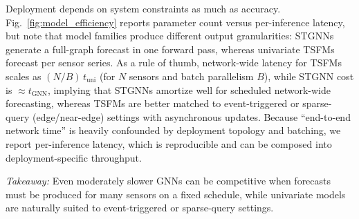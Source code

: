 \documentclass[10pt]{article}
\begin{document}
Deployment depends on system constraints as much as accuracy. Fig.~\ref{fig:model_efficiency} reports parameter
count versus per-inference latency, but note that model families produce different output granularities:
STGNNs generate a full-graph forecast in one forward pass, whereas univariate TSFMs forecast per sensor series.
As a rule of thumb, network-wide latency for TSFMs scales as $(N/B)\,t_{\text{uni}}$ (for $N$ sensors and batch
parallelism $B$), while STGNN cost is $\approx t_{\text{GNN}}$, implying that STGNNs amortize well for scheduled
network-wide forecasting, whereas TSFMs are better matched to event-triggered or sparse-query (edge/near-edge)
settings with asynchronous updates. Because ``end-to-end network time'' is heavily confounded by deployment
topology and batching, we report per-inference latency, which is reproducible and can be composed into
deployment-specific throughput.





\begin{keydiscovery1}
 \emph{Takeaway:}
 Even moderately slower GNNs can be competitive
when forecasts must be produced for many sensors on a fixed schedule, while univariate models are naturally
suited to event-triggered or sparse-query settings.  
\end{keydiscovery1}
\end{document}
